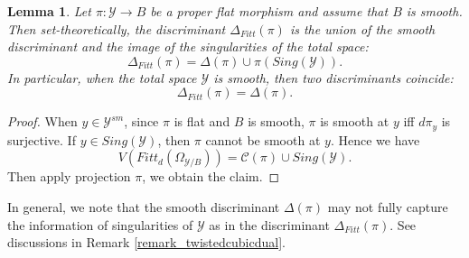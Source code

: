 \documentclass[12pt]{amsart}
\newtheorem{lemma}[theorem]{Lemma}
\newtheorem{remark}[theorem]{Remark}
\begin{document}












\begin{lemma}\label{lemmma_disc_vs_smoothdisc}
Let $\pi: \mathcal Y\to B$ be a proper flat morphism and assume that $B$ is smooth. Then set-theoretically, the discriminant $\Delta_{Fitt}(\pi)$ is the union of the smooth discriminant and the image of the singularities of the total space:
    $$\Delta_{Fitt}(\pi)=\Delta(\pi)\cup \pi(Sing(\mathcal Y)).$$
In particular, when the total space $\mathcal {Y}$ is smooth, then two discriminants coincide: $$\Delta_{Fitt}(\pi)=\Delta(\pi).$$ 
\end{lemma}
\begin{proof}
    When $y\in \mathcal Y^{sm}$,  since $\pi$ is flat and $B$ is smooth, $\pi$ is smooth at $y$ iff $d\pi_y$ is surjective. If $y\in Sing(\mathcal Y)$, then $\pi$ cannot be smooth at $y$. Hence we have $$V(Fitt_d(\Omega_{\mathcal Y/B}))=\mathcal C(\pi)\cup Sing(\mathcal Y).$$
    Then apply projection $\pi$, we obtain the claim.
\end{proof}
In general, we note that the smooth discriminant $\Delta(\pi)$ may not fully capture the information of singularities of $\mathcal Y$ as in the discriminant $\Delta_{Fitt}(\pi)$. See discussions in Remark \ref{remark_twistedcubicdual}.
\end{document}
